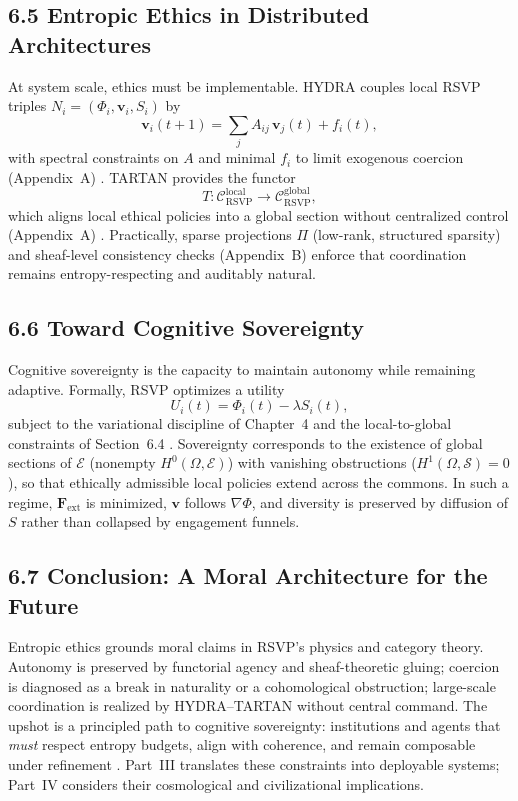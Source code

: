 \documentclass[12pt]{article}
\begin{document}
\subsection*{6.5 Entropic Ethics in Distributed Architectures}

At system scale, ethics must be implementable. HYDRA couples local RSVP triples
\(N_i=(\Phi_i,\mathbf{v}_i,S_i)\) by
\[
\mathbf{v}_i(t+1)=\sum_j A_{ij}\,\mathbf{v}_j(t)+f_i(t),
\]
with spectral constraints on \(A\) and minimal \(f_i\) to limit exogenous coercion
(Appendix~A) \citep{bird1988}. TARTAN provides the functor
\[
T:\mathcal{C}_{\text{RSVP}}^{\mathrm{local}}\to\mathcal{C}_{\text{RSVP}}^{\mathrm{global}},
\]
which aligns local ethical policies into a global section without centralized control
(Appendix~A) \citep{milewski2018}. Practically, sparse projections \(\Pi\) (low-rank,
structured sparsity) and sheaf-level consistency checks (Appendix~B) enforce that
coordination remains entropy-respecting and auditably natural.

\subsection*{6.6 Toward Cognitive Sovereignty}

Cognitive sovereignty is the capacity to maintain autonomy while remaining adaptive.
Formally, RSVP optimizes a utility
\[
U_i(t)=\Phi_i(t)-\lambda S_i(t),
\]
subject to the variational discipline of Chapter~4 and the local-to-global constraints of
Section~6.4 \citep{hanson2003, ortega1957}. Sovereignty corresponds to the existence of
global sections of \(\mathcal{E}\) (nonempty \(H^0(\Omega,\mathcal{E})\)) with vanishing obstructions
(\(H^1(\Omega,\mathcal{S})=0\)), so that ethically admissible local policies extend across the
commons. In such a regime, \(\mathbf{F}_{\mathrm{ext}}\) is minimized, \(\mathbf{v}\) follows \(\nabla\Phi\), and
diversity is preserved by diffusion of \(S\) rather than collapsed by engagement funnels.

\subsection*{6.7 Conclusion: A Moral Architecture for the Future}

Entropic ethics grounds moral claims in RSVP’s physics and category theory. Autonomy
is preserved by functorial agency and sheaf-theoretic gluing; coercion is diagnosed as a
break in naturality or a cohomological obstruction; large-scale coordination is realized by
HYDRA–TARTAN without central command. The upshot is a principled path to cognitive
sovereignty: institutions and agents that \emph{must} respect entropy budgets, align with
coherence, and remain composable under refinement \citep{whitehead1978, deleuze1987}.
Part~III translates these constraints into deployable systems; Part~IV considers their
cosmological and civilizational implications.
\end{document}
